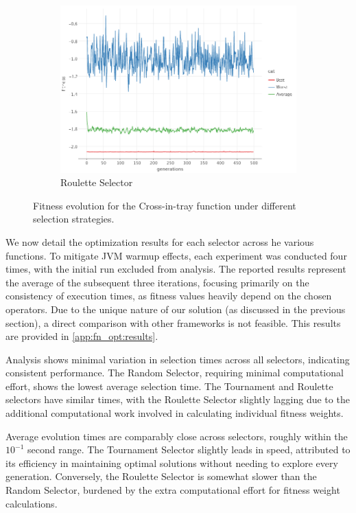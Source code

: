 \begin{figure}[ht!]
\begin{subfigure}{.45\textwidth}
            \includegraphics[width=\linewidth]{img/cross_in_tray_roulette.png}
            \caption{Roulette Selector}
        \end{subfigure}
        \caption{Fitness evolution for the Cross-in-tray function under different selection strategies.}
        \label{fig:fn_opt:results:cross_in_tray}
    \end{figure}

    We now detail the optimization results for each selector across he various functions. To mitigate JVM warmup effects, each experiment was conducted four times, with the initial run excluded from analysis. The reported 
    results represent the average of the subsequent three iterations, focusing primarily on the consistency of 
    execution times, as fitness values heavily depend on the chosen operators. Due to the unique nature of our solution 
    (as discussed in the previous section), a direct comparison with other frameworks is not feasible. This results are provided in \vref{app:fn_opt:results}.

    Analysis shows minimal variation in selection times across all selectors, indicating consistent performance. The 
    Random Selector, requiring minimal computational effort, shows the lowest average selection time. The Tournament 
    and Roulette selectors have similar times, with the Roulette Selector slightly lagging due to the additional 
    computational work involved in calculating individual fitness weights.
    
    Average evolution times are comparably close across selectors, roughly within the \(10^{-1}\) second range. The 
    Tournament Selector slightly leads in speed, attributed to its efficiency in maintaining optimal solutions without 
    needing to explore every generation. Conversely, the Roulette Selector is somewhat slower than the Random Selector, 
    burdened by the extra computational effort for fitness weight calculations.
    
